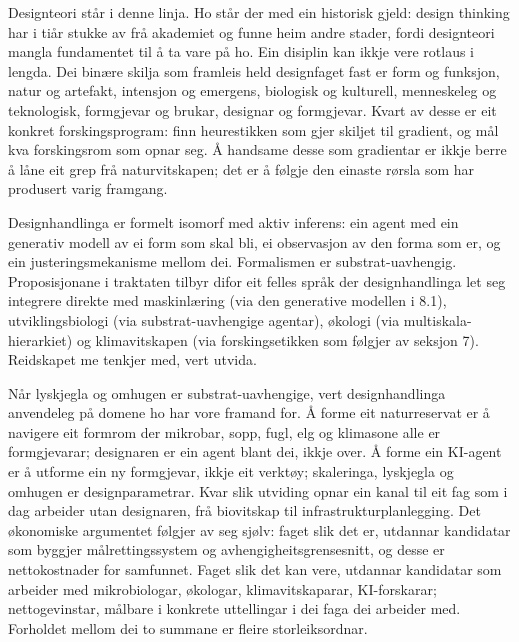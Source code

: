 \begin{widebody}
{Designteori står i denne linja. Ho står der med ein historisk gjeld: design thinking har i tiår stukke av frå akademiet og funne heim andre stader, fordi designteori mangla fundamentet til å ta vare på ho. Ein disiplin kan ikkje vere rotlaus i lengda. Dei binære skilja som framleis held designfaget fast er form og funksjon, natur og artefakt, intensjon og emergens, biologisk og kulturell, menneskeleg og teknologisk, formgjevar og brukar, designar og formgjevar. Kvart av desse er eit konkret forskingsprogram: finn heurestikken som gjer skiljet til gradient, og mål kva forskingsrom som opnar seg. Å handsame desse som gradientar er ikkje berre å låne eit grep frå naturvitskapen; det er å følgje den einaste rørsla som har produsert varig framgang.

Designhandlinga er formelt isomorf med aktiv inferens: ein agent med ein generativ modell av ei form som skal bli, ei observasjon av den forma som er, og ein justeringsmekanisme mellom dei. Formalismen er substrat-uavhengig. Proposisjonane i traktaten tilbyr difor eit felles språk der designhandlinga let seg integrere direkte med maskinlæring (via den generative modellen i 8.1), utviklingsbiologi (via substrat-uavhengige agentar), økologi (via multiskala-hierarkiet) og klimavitskapen (via forskingsetikken som følgjer av seksjon 7). Reidskapet me tenkjer med, vert utvida.

Når lyskjegla og omhugen er substrat-uavhengige, vert designhandlinga anvendeleg på domene ho har vore framand for. Å forme eit naturreservat er å navigere eit formrom der mikrobar, sopp, fugl, elg og klimasone alle er formgjevarar; designaren er ein agent blant dei, ikkje over. Å forme ein KI-agent er å utforme ein ny formgjevar, ikkje eit verktøy; skaleringa, lyskjegla og omhugen er designparametrar. Kvar slik utviding opnar ein kanal til eit fag som i dag arbeider utan designaren, frå biovitskap til infrastrukturplanlegging. Det økonomiske argumentet følgjer av seg sjølv: faget slik det er, utdannar kandidatar som byggjer målrettingssystem og avhengigheitsgrensesnitt, og desse er nettokostnader for samfunnet. Faget slik det kan vere, utdannar kandidatar som arbeider med mikrobiologar, økologar, klimavitskaparar, KI-forskarar; nettogevinstar, målbare i konkrete uttellingar i dei faga dei arbeider med. Forholdet mellom dei to summane er fleire storleiksordnar.

}
\end{widebody}
